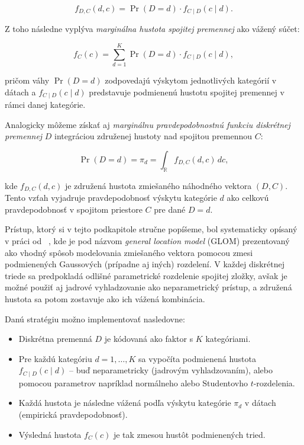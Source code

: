 \begin{equation}
f_{D,C}(d, c) = \Pr(D = d) \cdot f_{C \mid D}(c \mid d).
\end{equation}

Z toho následne vyplýva \textit{marginálna hustota spojitej premennej} ako vážený súčet:

\begin{equation}
f_C(c) = \sum_{d=1}^{K} \Pr(D = d) \cdot f_{C \mid D}(c \mid d),
\end{equation}

pričom váhy $\Pr(D = d)$ zodpovedajú výskytom jednotlivých kategórií v dátach a $f_{C \mid D}(c \mid d)$ predstavuje podmienenú hustotu spojitej premennej v rámci danej kategórie.

Analogicky môžeme získať aj \textit{marginálnu pravdepodobnostnú funkciu diskrétnej premennej} $D$ integráciou združenej hustoty nad spojitou premennou $C$:

\begin{equation}
\Pr(D = d) = \pi_d = \int_{\mathbb{R}} f_{D,C}(d, c) \, dc,
\end{equation}

kde $f_{D,C}(d, c)$ je združená hustota zmiešaného náhodného vektora $(D, C)$. Tento vzťah vyjadruje pravdepodobnosť výskytu kategórie $d$ ako celkovú pravdepodobnosť v spojitom priestore $C$ pre dané $D = d$.

\bigskip

Prístup, ktorý si v tejto podkapitole stručne popíšeme, bol systematicky opísaný v práci od ~\textcite{pleisMixtureDissertation}, kde je pod názvom \textit{general location model} (GLOM) prezentovaný ako vhodný spôsob modelovania zmiešaného vektora pomocou zmesi podmienených Gaussových (prípadne aj iných) rozdelení. V každej diskrétnej triede sa predpokladá odlišné parametrické rozdelenie spojitej zložky, avšak je možné použiť aj jadrové vyhladzovanie ako neparametrický prístup, a združená hustota sa potom zostavuje ako ich vážená kombinácia.

Danú stratégiu možno implementovať nasledovne:
\begin{itemize}
  \item Diskrétna premenná $D$ je kódovaná ako faktor s $K$ kategóriami.
  \item Pre každú kategóriu $d = 1, \dots, K$ sa vypočíta podmienená hustota $f_{C \mid D}(c \mid d)$ – buď neparametricky (jadrovým vyhladzovaním), alebo pomocou parametrov napríklad normálneho alebo Studentovho $t$-rozdelenia.
  \item Každá hustota je následne vážená podľa výskytu kategórie $\pi_d$ v dátach (empirická pravdepodobnosť).
  \item Výsledná hustota $f_C(c)$ je tak zmesou hustôt podmienených tried.
\end{itemize}

